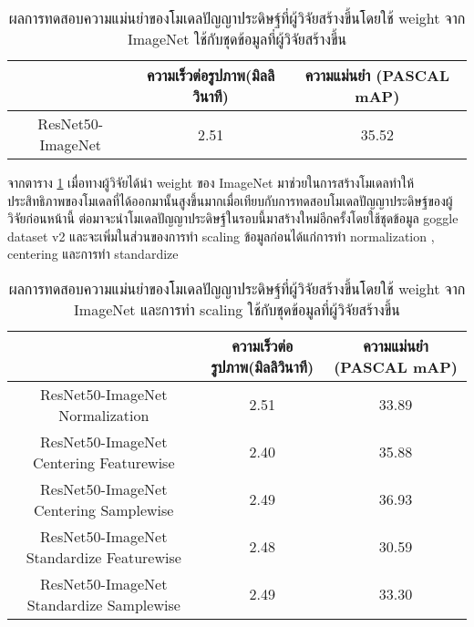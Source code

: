 \begin{table}[!ht]
	\centering
	\begin{tabular}{|c|c|c|}
			\hline
			{}&{ความเร็วต่อรูปภาพ(มิลลิวินาที)}&{ความแม่นยำ (PASCAL mAP)}			\\
			\hline
			ResNet50-ImageNet			& 2.51			& 35.52				\\
			\hline
	\end{tabular}
\caption{ผลการทดสอบความแม่นยำของโมเดลปัญญาประดิษฐ์ที่ผู้วิจัยสร้างขึ้นโดยใช้ weight จาก ImageNet ใช้กับชุดข้อมูลที่ผู้วิจัยสร้างขึ้น}
\label{tab: Test PASCAL mAP of dataset created by the researcher and pretrain weight imagenet}
\end{table}
จากตาราง \ref{tab: Test PASCAL mAP of dataset created by the researcher and pretrain weight imagenet} เมื่อทางผู้วิจัยได้นำ weight ของ ImageNet มาช่วยในการสร้างโมเดลทำให้ประสิทธิภาพของโมเดลที่ได้ออกมานั้นสูงขึ้นมากเมื่อเทียบกับการทดสอบโมเดลปัญญาประดิษฐ์ของผู้วิจัยก่อนหน้านี้ ต่อมาจะนำโมเดลปัญญาประดิษฐ์ในรอบนี้มาสร้างใหม่อีกครั้งโดยใช้ชุดข้อมูล goggle dataset v2 และจะเพิ่มในส่วนของการทำ scaling ข้อมูลก่อนได้แก่การทำ normalization , centering และการทำ standardize

\begin{table}[!ht]
	\centering
	\begin{tabular}{|c|c|c|}
			\hline
			{}&{ความเร็วต่อรูปภาพ(มิลลิวินาที)}&{ความแม่นยำ (PASCAL mAP)}			\\
			\hline
			ResNet50-ImageNet	 Normalization				& 2.51			& 33.89				\\
			ResNet50-ImageNet	 Centering Featurewise		& 2.40			& 35.88				\\
			ResNet50-ImageNet	 Centering Samplewise		& 2.49			& 36.93				\\
			ResNet50-ImageNet	 Standardize Featurewise		& 2.48			& 30.59				\\
			ResNet50-ImageNet	 Standardize Samplewise		& 2.49			& 33.30				\\
			\hline
	\end{tabular}
\caption{ผลการทดสอบความแม่นยำของโมเดลปัญญาประดิษฐ์ที่ผู้วิจัยสร้างขึ้นโดยใช้ weight จาก ImageNet และการทำ scaling ใช้กับชุดข้อมูลที่ผู้วิจัยสร้างขึ้น}
\label{tab: Test PASCAL mAP of dataset created by the researcher with pretrain weight imagenet and scaling}
\end{table}


